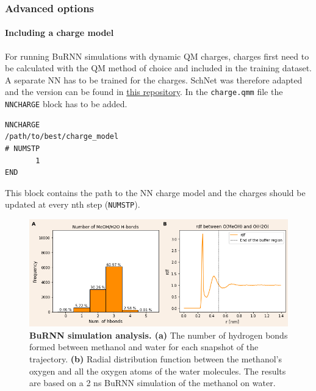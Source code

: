 \subsubsection{Advanced options}
\paragraph{Including a charge model}
For running BuRNN simulations with dynamic QM charges, charges first need to be calculated with the QM method of choice and included in the training dataset. A separate NN has to be trained for the charges. SchNet was therefore adapted and the version can be found in \href{https://github.com/juliawestermayr/schnetpack}{this repository}.
In the \texttt{charge.qmm} file the \texttt{NNCHARGE} block has to be added. 

\begin{lstlisting}[breaklines=true, breakatwhitespace=false]
NNCHARGE
/path/to/best/charge_model
# NUMSTP
       1
END
\end{lstlisting}
This block contains the path to the NN charge model and the charges should be updated at every nth step (\texttt{NUMSTP}). 

\begin{figure}[H]
\centering
\includegraphics[scale=.66]{../09_tutorial_06/figures/burnn_livecoms_v2.png}
\caption{\textbf{BuRNN simulation analysis. (a)} The number of hydrogen bonds formed between methanol and water for each snapshot of the trajectory. \textbf{(b)} Radial distribution function between the methanol's oxygen and all the oxygen atoms of the water molecules. The results are based on a 2 ns BuRNN simulation of the methanol on water.}
\label{BuRNN_ana}
\end{figure}

